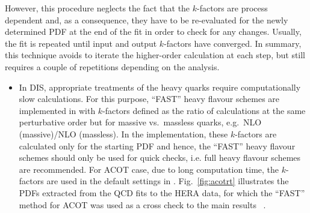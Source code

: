   However, this procedure neglects the fact that the $k$-factors are
  process dependent and, 
  as a consequence, they have to be re-evaluated
  for the newly determined PDF at the end of the fit in order to check
  for any changes. Usually, the fit is repeated until input and output
  $k$-factors have converged. In summary, this technique avoids to
  iterate the higher-order calculation at each step, but still
  requires a couple of repetitions depending on the analysis.


\begin{itemize}
%
  \item In DIS, appropriate treatments of the heavy quarks require  
    computationally slow calculations.
    For this purpose, ``FAST'' heavy flavour schemes are implemented
    in \fitter with $k$-factors defined as the ratio of
    calculations at the same perturbative order but for massive vs.\
    massless quarks, e.g.\ NLO (massive)/NLO (massless).
    In the \fitter
    implementation, these $k$-factors are calculated only for the
    starting PDF and hence, the ``FAST'' heavy flavour schemes should
    only be used for quick checks, i.e. full heavy flavour schemes
    are recommended. For ACOT case,
    due to long computation time, the $k$-factors are used in 
    the default settings in \fitter.  Fig.~\ref{fig:acotrt} illustrates
    the PDFs extracted from  the QCD fits to the HERA data, for which 
     the ``FAST'' method for ACOT was used as a cross check to the main results ~\cite{h1zeus:2009wt}.


\end{itemize}
